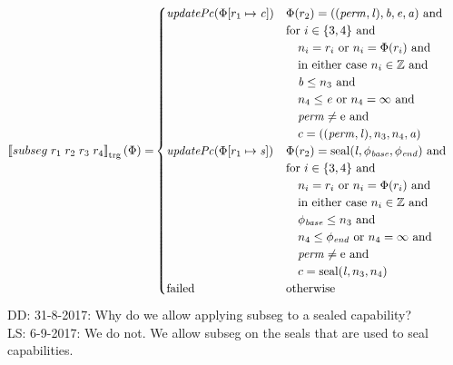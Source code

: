 \documentclass[a4paper]{article}
\newcommand\lau[1]{{\color{purple} \sf \footnotesize {LS: #1}}\\}
\newcommand\dominique[1]{{\color{purple} \sf \footnotesize {DD: #1}}\\}
\newcommand{\sem}[1]{\left\llbracket #1 \right\rrbracket}
\newcommand{\tsem}[2][\Phi]{\sem{#2}_{\mathrm{trg}}(#1)}
\newcommand{\tand}{\text{ and }}
\newcommand{\totherwise}{\text{otherwise }}
\newcommand{\targetcolor}[1]{\color{black}}
\newcommand{\trg}[1]{{\targetcolor{} #1}}
\newcommand{\zinstr}[1]{#1}
\newcommand{\fourinstr}[5]{
  \ifthenelse{\equal{#2#3#4#5}{}}
  {\zinstr{#1}}
  {\zinstr{#1} \; #2 \; #3 \; #4 \; #5}
}
\newcommand{\tsubseg}[4]{\fourinstr{\trg{subseg}}{#1}{#2}{#3}{#4}}
\newcommand{\ints}{\mathbb{Z}}
\newcommand{\update}[2]{[#1 \mapsto #2]}
\newcommand{\shareddom}[1]{\mathrm{#1}}
\newcommand{\perm}{\var{perm}}
\newcommand{\lin}{\var{l}}
\newcommand{\seal}[1]{\shareddom{seal}(#1)}
\newcommand{\failed}{\mathrm{failed}}
\newcommand{\var}[1]{\mathit{#1}}
\newcommand{\baddr}{\var{b}}
\newcommand{\eaddr}{\var{e}}
\newcommand{\aaddr}{\var{a}}
\newcommand{\plainperm}[1]{\mathrm{#1}}
\newcommand{\enter}{\plainperm{e}}
\newcommand{\plainfun}[2]{
  \ifthenelse{\equal{#2}{}}
  {\mathit{#1}}
  {\mathit{#1}(#2)}
}
\newcommand{\updPcAddr}[1]{\plainfun{updatePc}{#1}}
\begin{document}
\begin{align*}
  \tsem{\tsubseg{r_1}{r_2}{r_3}{r_4}} = &
                                     \begin{cases}
                                       \updPcAddr{\Phi\update{r_1}{\var{c}}} &
                                       \arraycolsep=0pt
                                       \begin{array}[t]{l}
                                         \Phi(r_2) = ((\perm,\lin),\baddr, \eaddr, \aaddr) \tand \\
                                         \text{for $i \in \{3,4\}$ and} \\
                                         \quad n_i = r_i \text{ or } n_i = \Phi(r_i) \tand \\
                                         \quad \text{in either case $n_i \in \ints$ and} \\
                                         \quad \baddr \leq n_3 \tand \\
                                         \quad n_4 \leq \eaddr \text{ or } n_4 = \infty \tand \\
                                         \quad \perm \neq \enter \tand \\
                                         \quad c = ((\perm,\lin),n_3,n_4,\aaddr)
                                       \end{array} \\
                                       \updPcAddr{\Phi\update{r_1}{\var{s}}} &
                                       \arraycolsep=0pt
                                       \begin{array}[t]{l}
                                         \Phi(r_2) = \seal{\lin,\phi_{\var{base}},\phi_{\var{end}}} \tand \\
                                         \text{for $i \in \{3,4\}$ and} \\
                                         \quad n_i = r_i \text{ or } n_i = \Phi(r_i) \tand \\
                                         \quad \text{in either case $n_i \in \ints$ and} \\
                                         \quad \phi_{\var{base}} \leq n_3 \tand \\
                                         \quad n_4 \leq \phi_{\var{end}} \text{ or } n_4 = \infty \tand \\
                                         \quad \perm \neq \enter \tand \\
                                         \quad c = \seal{\lin, n_3,n_4}
                                       \end{array} \\
                                       \failed & \totherwise
                                     \end{cases}
\end{align*}
\dominique{31-8-2017: Why do we allow applying subseg to a sealed capability?}
\lau{6-9-2017: We do not. We allow subseg on the seals that are used to seal capabilities.}
\end{document}
